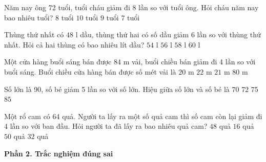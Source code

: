 \begin{ex} %
Năm nay ông 72 tuổi, tuổi cháu giảm đi 8 lần so với tuổi ông. Hỏi cháu năm nay bao nhiêu tuổi?
\choice
{$8$ tuổi}
{$10$ tuổi}
{\True $9$ tuổi}
{$7$ tuổi}
\end{ex}

\begin{ex} %
Thùng thứ nhất có $48\text{ l}$ dầu, thùng thứ hai có số dầu giảm 6 lần so với thùng thứ nhất. Hỏi cả hai thùng có bao nhiêu lít dầu?
\choice
{$54\text{ l}$}
{\True $56\text{ l}$}
{$58\text{ l}$}
{$60\text{ l}$}
\end{ex}

\begin{ex} %
Một cửa hàng buổi sáng bán được $84\text{ m}$ vải, buổi chiều bán giảm đi 4 lần so với buổi sáng. Buổi chiều cửa hàng bán được số mét vải là
\choice
{$20\text{ m}$}
{$22\text{ m}$}
{\True $21\text{ m}$}
{$80\text{ m}$}
\end{ex}

\begin{ex} %
Số lớn là 90, số bé giảm 5 lần so với số lớn. Hiệu giữa số lớn và số bé là
\choice
{$70$}
{\True $72$}
{$75$}
{$85$}
\end{ex}

\begin{ex} %
Một rổ cam có 64 quả. Người ta lấy ra một số quả cam thì số cam còn lại giảm đi 4 lần so với ban đầu. Hỏi người ta đã lấy ra bao nhiêu quả cam?
\choice
{\True $48$ quả}
{$16$ quả}
{$50$ quả}
{$32$ quả}
\end{ex}

\textbf{Phần 2. Trắc nghiệm đúng sai}

